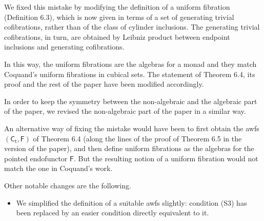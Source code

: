 \documentclass[reqno,10pt,a4paper,oneside,draft]{amsart}
\begin{document}
\begin{itemize}
We fixed this mistake by modifying the definition of a uniform fibration (Definition 6.3), which is now given in terms of a set of generating trivial cofibrations, rather than of
the class of cylinder inclusions. The generating trivial cofibrations, in turn, are obtained by Leibniz product between endpoint inclusions and generating cofibrations. 

In this way, the uniform fibrations are the algebras for a monad and they match Coquand's uniform fibrations in cubical sets. The statement
of Theorem 6.4, its proof and the rest of the paper have been modified accordingly. 

In order to keep the symmetry between the non-algebraic and the algebraic part of the paper,
we  revised  the non-algebraic part of the paper in a similar way. 

An alternative way of fixing the mistake would have been to first obtain the awfs $(\mathsf{C_t}, \mathsf{F})$ of Theorem 6.4 (along the lines of the proof of Theorem 6.5 in the version of the paper), and then define uniform fibrations as the algebras for the pointed endofunctor $\mathsf{F}$.
But the resulting notion of a uniform fibration would not match the one in Coquand's work.
\end{itemize}

Other notable changes are the following.

\begin{itemize}
\item
We simplified the definition of a suitable awfs slightly: condition (S3) has been replaced by an easier condition directly equivalent to it.
\end{itemize}
\end{document}

